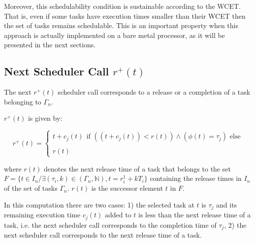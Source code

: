 \documentclass[conference,compsocconf]{IEEEtran}
\begin{document}
Moreover, this schedulability condition is sustainable according to the
WCET. That is, even if some tasks have execution times smaller than their WCET
then the set of tasks remains schedulable. This is an important property when
this approach is actually implemented on a bare metal processor, as it will be
presented in the next sections.

\subsection{Next Scheduler Call $r^{+}(t)$}

The next $r^{+}(t)$ scheduler call corresponds to a release or a completion of
a task belonging to $\Gamma_n$. 


$r^{+}(t)$ is given by:

\begin{comment}
\begin{equation*} \label{r_plus}
  r^+(t)= \left\{
            \begin{array}{ll}
               t+c_k(t)  \ \    \mbox{if $((t+c_k(t))<r_i^k(t))\wedge(\phi(t)=\tau_k)$  else} \\\\
              a(t)
        \end{array}
          \right.
\end{equation*}
\end{comment}

\begin{equation*} \label{r_plus}
  r^+(t)= \left\{
            \begin{array}{ll}
               t+c_j(t)  \ \    \mbox{if $((t+c_j(t))<r(t))\wedge(\phi(t)=\tau_j)$  else} \\\\
              r(t)
        \end{array}
          \right.
\end{equation*}


where $r(t)$ denotes the next release time of a task that belongs to the set
$F=\{t \in I_n / \exists (\tau_i,k) \in (\Gamma_n,\mathbb{N}), t=r_i^1 +
kT_i\}$ containing the release times in $I_n$ of the set of tasks
$\Gamma_n$. $r(t)$ is the successor element $t$ in $F$.

In this computation there are two cases: 1) the selected task at $t$ is
$\tau_j$ and its remaining execution time $c_j(t)$ added to $t$ is less than
the next release time of a task, i.e. the next scheduler call corresponds to
the completion time of $\tau_j$, 2) the next scheduler call corresponds to the
next release time of a task.
\end{document}
